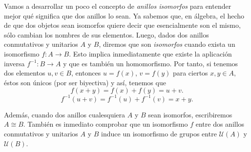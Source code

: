\documentclass[12pt]{article}
\begin{document}
Vamos a desarrollar un poco el concepto de \textit{anillos isomorfos} para entender mejor qué significa que dos anillos lo sean. Ya sabemos que, en álgebra, el hecho de que dos objetos sean isomorfos quiere decir que esencialmente son el mismo, sólo cambian los nombres de sus elementos. Luego, dados dos anillos conmutativos y unitarios $A$ y $B$, diremos que son \textit{isomorfos} cuando exista un isomorfismo $f \colon A \longrightarrow B$. Esto implica inmediatamente que existe la aplicación inversa $f^{-1} \colon B \longrightarrow A$ y que es también un homomorfismo. Por tanto, si tenemos dos elementos $u,v \in B$, entonces $u=f(x)$, $v=f(y)$ para ciertos $x,y \in A$, éstos son únicos (por ser biyectiva) y así, tenemos que $$f(x+y)= f(x) + f(y) = u + v.$$ $$f^{-1}(u+v) = f^{-1}(u) + f^{-1}(v)= x + y.$$

Además, cuando dos anillos cualesquiera $A$ y $B$ sean isomorfos, escribiremos $A\cong B$. También es inmediato comprobar que un isomorfismo $f$ entre dos anillos conmutativos y unitarios $A$ y $B$ induce un isomorfismo de grupos entre $\mathcal{U}(A)$ y $\mathcal{U}(B)$.
\end{document}
